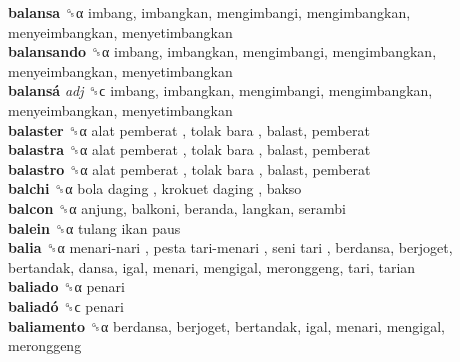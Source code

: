 \textbf{balansa} ␝α  imbang, imbangkan, mengimbangi, mengimbangkan, menyeimbangkan, menyetimbangkan  \\
\textbf{balansando} ␝α  imbang, imbangkan, mengimbangi, mengimbangkan, menyeimbangkan, menyetimbangkan  \\
\textbf{balansá} \emph{adj}  ␝ϲ  imbang, imbangkan, mengimbangi, mengimbangkan, menyeimbangkan, menyetimbangkan  \\
\textbf{balaster} ␝α   alat pemberat ,  tolak bara , balast, pemberat  \\
\textbf{balastra} ␝α   alat pemberat ,  tolak bara , balast, pemberat  \\
\textbf{balastro} ␝α   alat pemberat ,  tolak bara , balast, pemberat  \\
\textbf{balchi} ␝α   bola daging ,  krokuet daging , bakso  \\
\textbf{balcon} ␝α  anjung, balkoni, beranda, langkan, serambi  \\
\textbf{balein} ␝α   tulang ikan paus   \\
\textbf{balia} ␝α   menari-nari ,  pesta tari-menari ,  seni tari , berdansa, berjoget, bertandak, dansa, igal, menari, mengigal, meronggeng, tari, tarian  \\
\textbf{baliado} ␝α  penari  \\
\textbf{baliadó} ␝ϲ  penari  \\
\textbf{baliamento} ␝α  berdansa, berjoget, bertandak, igal, menari, mengigal, meronggeng  \\
